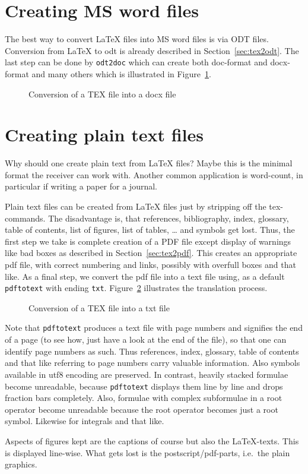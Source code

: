 \section{Creating MS word files}\label{sec:tex2doc}

The best way to convert \LaTeX{} files into MS word files is via ODT files. 
Conversion from \LaTeX{} to odt 
is already described in Section~\ref{sec:tex2odt}. 
The last step can be done by \texttt{odt2doc} which can create both 
doc-format and docx-format and many others 
which is illustrated in Figure~\ref{fig:tex2doc}. 


\begin{figure}[htb]
\centering
{}
\caption{\label{fig:tex2doc}Conversion of a TEX file into a docx file}
\end{figure}



\section{Creating plain text files}\label{sec:tex2txt}

Why should one create plain text from \LaTeX{} files? 
Maybe this is the minimal format the receiver can work with. 
Another common application is word-count, 
in particular if writing a paper for a journal. 

Plain text files can be created from \LaTeX{} files 
just by stripping off the tex-commands. 
The disadvantage is, 
that references, bibliography, index, glossary, 
table of contents, list of figures, list of tables, \dots 
and symbols get lost. 
Thus, the first step we take is complete creation of a PDF file 
except display of warnings like bad boxes 
as described in Section~\ref{sec:tex2pdf}. 
This creates an appropriate pdf file, 
with correct numbering and links, 
possibly with overfull boxes and that like. 
As a final step, we convert the pdf file into a text file 
using, as a default \texttt{pdftotext} with ending \texttt{txt}. 
Figure~\ref{fig:tex2txt} illustrates the translation process. 

\begin{figure}[htb]
\centering
{}
\caption{\label{fig:tex2txt}Conversion of a TEX file into a txt file}
\end{figure}

Note that \texttt{pdftotext} produces a text file with page numbers 
and signifies the end of a page 
(to see how, just have a look at the end of the file), 
so that one can identify page numbers as such. 
Thus references, index, glossary, table of contents and that like 
referring to page numbers carry valuable information. 
Also symbols available in utf8 encoding are preserved. 
In contrast, heavily stacked formulae become unreadable, 
because \texttt{pdftotext} displays them line by line 
and drops fraction bars completely. 
Also, formulae with complex subformulae in a root operator  
become unreadable because the root operator becomes just a root symbol. 
Likewise for integrals and that like. 

Aspects of figures kept are the captions of course but also the \LaTeX-texts. 
This is displayed line-wise. 
What gets lost is the postscript/pdf-parts, i.e.~the plain graphics. 

\raggedbottom{}

